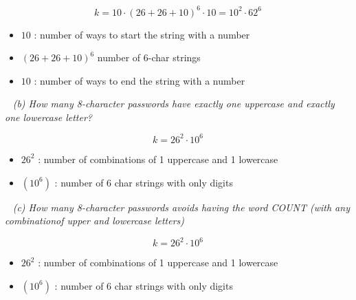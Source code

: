 \documentclass[12pt, letterpaper]{article}
\begin{document}
\[ k = 10\cdot (26 + 26 + 10)^{6} \cdot 10 = 10^{2} \cdot 62^{6}\]

\begin{itemize}
    \item \(10\) : number of ways to start the string with a number
    \item \((26 + 26 + 10)^{6}\) number of 6-char strings
    \item \(10 \) : number of ways to end the string with  a number
\end{itemize} 

\-\ \newline
\it{ (b) How many 8-character passwords have exactly one uppercase and exactly one lowercase letter?  }

\[ k = 26^{2} \cdot 10^{6} \]

\begin{itemize}
    \item \(26^{2}\) : number of combinations of 1 uppercase and 1 lowercase
    \item \((10^{6}) \) : number of 6 char strings with only digits
\end{itemize}


\-\ \newline
\it{ (c) How many 8-character passwords avoids having the word COUNT (with any combinationof upper and lowercase letters)  }

\[ k = 26^{2} \cdot 10^{6} \]

\begin{itemize}
    \item \(26^{2}\) : number of combinations of 1 uppercase and 1 lowercase
    \item \((10^{6}) \) : number of 6 char strings with only digits
\end{itemize}
\end{document}
